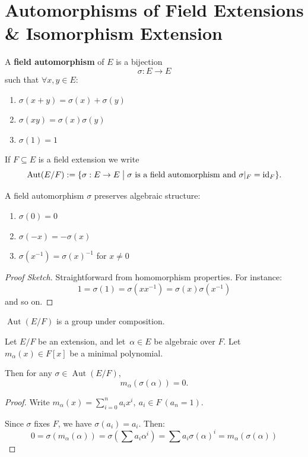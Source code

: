 \newpage 
\section{Automorphisms of Field Extensions \& 
Isomorphism Extension}
\begin{defn}
    A \textbf{field automorphism} of $E$ is a bijection 
    \[
        \sigma : E \to E
    \]
    such that $\forall x,y \in E$: 
    \begin{enumerate}
        \item $\sigma (x+y) = \sigma(x) + \sigma(y)$ 
        \item $\sigma(xy) = \sigma(x)\sigma(y)$
        \item $\sigma(1) = 1$
    \end{enumerate}
\end{defn}
If $F \subseteq E$ is a field extension we write 
\[
    \operatorname{Aut}(E/F) := 
    \{\sigma : E \to E \bigm| \sigma 
        \ \text{is a field automorphism and} \ 
    \sigma|_F = \operatorname{id}_F\}.
\]

\begin{prop}
    A field automorphism $\sigma$ preserves algebraic 
    structure: 
    \begin{enumerate}
        \item $\sigma(0) = 0$ 
        \item $\sigma(-x) = -\sigma(x)$ 
        \item $\sigma(x^{-1}) = \sigma(x)^{-1}$ for 
            $x \neq 0$
    \end{enumerate}
\end{prop}
\begin{proof}[Proof Sketch]
    Straightforward from homomorphism 
    properties. For instance: 
    \[
        1 = \sigma(1) = \sigma(xx^{-1}) 
        = \sigma(x)\sigma(x^{-1})
    \]
    and so on.
\end{proof}

\begin{prop}
    $\operatorname{Aut}(E/F)$ is a group under composition.
\end{prop}

\begin{thm}
    Let $E/F$ be an extension, and let $\alpha \in E$ be 
    algebraic over $F$. Let $m_\alpha(x) \in F[x]$ be a 
    minimal polynomial. 

    Then for any $\sigma \in \operatorname{Aut}(E/F)$, 
    \[
        m_\alpha(\sigma(\alpha)) = 0.
    \]
\end{thm}
\begin{proof}
    Write $m_\alpha(x) = \sum_{i=0}^{n}a_ix^i, \ a_i \in F 
    \ (a_n = 1)$. 

    Since $\sigma$ fixes $F$, we have $\sigma(a_i) = a_i$. 
    Then:
    \[
        0 = \sigma(m_\alpha(\alpha)) 
        = \sigma\left(\sum a_i\alpha^i\right) 
        = \sum a_i\sigma(\alpha)^i = m_\alpha(\sigma(\alpha))
    \]
\end{proof}

